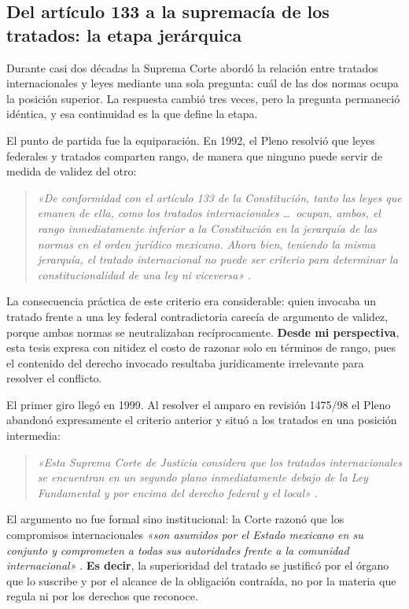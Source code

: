 \documentclass[
  spanish,
  letterpaper, oneside
]{article}
\begin{document}
\subsection{Del artículo 133 a la supremacía de los tratados: la etapa jerárquica}

Durante casi dos décadas la Suprema Corte abordó la relación entre tratados internacionales y leyes mediante una sola pregunta: cuál de las dos normas ocupa la posición superior. La respuesta cambió tres veces, pero la pregunta permaneció idéntica, y esa continuidad es la que define la etapa.

El punto de partida fue la equiparación. En 1992, el Pleno resolvió que leyes federales y tratados comparten rango, de manera que ninguno puede servir de medida de validez del otro:

\begin{quote}
\textit{«De conformidad con el artículo 133 de la Constitución, tanto las leyes que emanen de ella, como los tratados internacionales \dots\ ocupan, ambos, el rango inmediatamente inferior a la Constitución en la jerarquía de las normas en el orden jurídico mexicano. Ahora bien, teniendo la misma jerarquía, el tratado internacional no puede ser criterio para determinar la constitucionalidad de una ley ni viceversa»} \citep[tesis P. C/92]{scjnTesis205596}.
\end{quote}

La consecuencia práctica de este criterio era considerable: quien invocaba un tratado frente a una ley federal contradictoria carecía de argumento de validez, porque ambas normas se neutralizaban recíprocamente. \textbf{Desde mi perspectiva}, esta tesis expresa con nitidez el costo de razonar solo en términos de rango, pues el contenido del derecho invocado resultaba jurídicamente irrelevante para resolver el conflicto.

El primer giro llegó en 1999. Al resolver el amparo en revisión 1475/98 el Pleno abandonó expresamente el criterio anterior y situó a los tratados en una posición intermedia:

\begin{quote}
\textit{«Esta Suprema Corte de Justicia considera que los tratados internacionales se encuentran en un segundo plano inmediatamente debajo de la Ley Fundamental y por encima del derecho federal y el local»} \citep[tesis P. LXXVII/99]{scjnTesis192867}.
\end{quote}

El argumento no fue formal sino institucional: la Corte razonó que los compromisos internacionales \textit{«son asumidos por el Estado mexicano en su conjunto y comprometen a todas sus autoridades frente a la comunidad internacional»} \citep{scjnTesis192867}. \textbf{Es decir}, la superioridad del tratado se justificó por el órgano que lo suscribe y por el alcance de la obligación contraída, no por la materia que regula ni por los derechos que reconoce.
\end{document}
